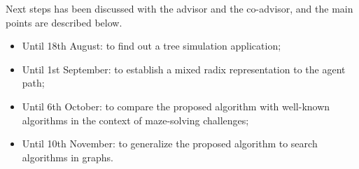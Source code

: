 Next steps has been discussed with the advisor and the co-advisor, and the main points are described below.

\begin{itemize}
\item Until 18th August: to find out a tree simulation application;
\item Until 1st September: to establish a mixed radix representation to the agent path;
\item Until 6th October: to compare the proposed algorithm with well-known algorithms in the context of maze-solving challenges;
\item Until 10th November: to generalize the proposed algorithm to search algorithms in graphs.
\end{itemize}